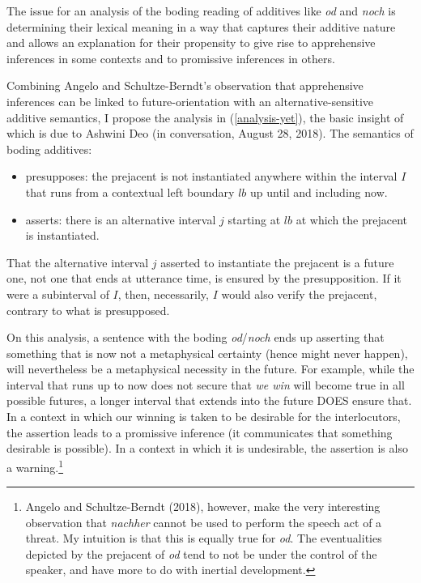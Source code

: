 \documentclass[output=paper,colorlinks,citecolor=brown]{langscibook}
\begin{document}
The issue for an analysis of the boding reading of additives like \textit{od} and \textit{noch} is determining their lexical meaning  in a way that captures their additive nature and allows an explanation for their propensity to give rise to apprehensive inferences in some contexts and to promissive inferences in others. 

Combining Angelo and Schultze-Berndt's observation that apprehensive inferences can be linked to future-orientation with an alternative-sensitive additive semantics, I propose the analysis in (\ref{analysis-yet}), the basic insight of which is due to Ashwini Deo (in conversation, August 28, 2018). 
\ea
\label{analysis-yet} \textnormal{The semantics of boding additives:}
\begin{itemize}\itemsep=-1mm
\item \textnormal{{\sc presupposes}: the prejacent is not instantiated anywhere within the interval $I$ that runs from a contextual left boundary $lb$ up until and including now.}  
\item \textnormal{{\sc asserts}: there is an alternative interval $j$ starting at $lb$ at which the prejacent is instantiated.} 
\end{itemize} 
\z

That the alternative interval $j$ asserted to instantiate the prejacent is a future one, not one that ends at utterance time, is ensured by the presupposition. If it were a subinterval of $I$, then, necessarily, $I$ would also verify the prejacent, contrary to what is presupposed. 

On this analysis, a sentence with the boding \textit{od}/\textit{noch} ends up asserting that something that is now not a metaphysical certainty (hence might never happen), will nevertheless be a metaphysical necessity in the future. For example, while the interval that runs up to now does not secure that \textit{we win} will become true in all possible futures, a longer interval that extends into the future DOES ensure that. In a context in which our winning is taken to be desirable for the interlocutors, the assertion leads to a promissive inference (it communicates that something desirable is possible). In a context in which it is undesirable, the assertion is also a warning.\footnote{Angelo and Schultze-Berndt (2018), however, make the very interesting observation that  \textit{nachher} cannot be used to perform the speech act of a threat. My intuition is that this is equally true for  \textit{od}. The eventualities depicted by the prejacent of \textit{od} tend to not be under the control of the speaker, and have more to do with inertial development.} 
\end{document}
